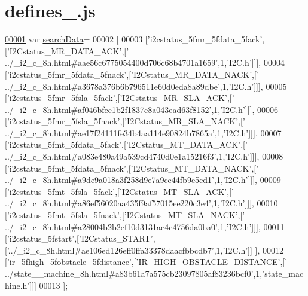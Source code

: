 \hypertarget{defines__7_8js_source}{}\section{defines\+\_.\+js}
\label{defines__7_8js_source}

\begin{DoxyCode}
\hypertarget{defines__7_8js_source.tex_l00001}{}\hyperlink{defines__7_8js_ad01a7523f103d6242ef9b0451861231e}{00001} var \hyperlink{defines__7_8js_ad01a7523f103d6242ef9b0451861231e}{searchData}=
00002 [
00003   [\textcolor{stringliteral}{'i2cstatus\_5fmr\_5fdata\_5fack'},[\textcolor{stringliteral}{'I2Cstatus\_MR\_DATA\_ACK'},[\textcolor{stringliteral}{'
      ../\_i2\_c\_8h.html#aae56c6775054400d706c68b4701a1659'},1,\textcolor{stringliteral}{'I2C.h'}]]],
00004   [\textcolor{stringliteral}{'i2cstatus\_5fmr\_5fdata\_5fnack'},[\textcolor{stringliteral}{'I2Cstatus\_MR\_DATA\_NACK'},[\textcolor{stringliteral}{'
      ../\_i2\_c\_8h.html#a3678a376b6b796511e60d0eda8a89dbe'},1,\textcolor{stringliteral}{'I2C.h'}]]],
00005   [\textcolor{stringliteral}{'i2cstatus\_5fmr\_5fsla\_5fack'},[\textcolor{stringliteral}{'I2Cstatus\_MR\_SLA\_ACK'},[\textcolor{stringliteral}{'
      ../\_i2\_c\_8h.html#af046bfee1b2f1837e8a043ead63f8152'},1,\textcolor{stringliteral}{'I2C.h'}]]],
00006   [\textcolor{stringliteral}{'i2cstatus\_5fmr\_5fsla\_5fnack'},[\textcolor{stringliteral}{'I2Cstatus\_MR\_SLA\_NACK'},[\textcolor{stringliteral}{'
      ../\_i2\_c\_8h.html#ae17f24111fe34b4aa114e90824b7865a'},1,\textcolor{stringliteral}{'I2C.h'}]]],
00007   [\textcolor{stringliteral}{'i2cstatus\_5fmt\_5fdata\_5fack'},[\textcolor{stringliteral}{'I2Cstatus\_MT\_DATA\_ACK'},[\textcolor{stringliteral}{'
      ../\_i2\_c\_8h.html#a083e480a49a539cd4740d0e1a15216f3'},1,\textcolor{stringliteral}{'I2C.h'}]]],
00008   [\textcolor{stringliteral}{'i2cstatus\_5fmt\_5fdata\_5fnack'},[\textcolor{stringliteral}{'I2Cstatus\_MT\_DATA\_NACK'},[\textcolor{stringliteral}{'
      ../\_i2\_c\_8h.html#a9de9a018a3f258d9e7a9ce44fb9e5cd1'},1,\textcolor{stringliteral}{'I2C.h'}]]],
00009   [\textcolor{stringliteral}{'i2cstatus\_5fmt\_5fsla\_5fack'},[\textcolor{stringliteral}{'I2Cstatus\_MT\_SLA\_ACK'},[\textcolor{stringliteral}{'
      ../\_i2\_c\_8h.html#a86ef56020aa435f9af57015ee220c3e4'},1,\textcolor{stringliteral}{'I2C.h'}]]],
00010   [\textcolor{stringliteral}{'i2cstatus\_5fmt\_5fsla\_5fnack'},[\textcolor{stringliteral}{'I2Cstatus\_MT\_SLA\_NACK'},[\textcolor{stringliteral}{'
      ../\_i2\_c\_8h.html#a28004b2b2ef10d3131ac4c4756da0ba0'},1,\textcolor{stringliteral}{'I2C.h'}]]],
00011   [\textcolor{stringliteral}{'i2cstatus\_5fstart'},[\textcolor{stringliteral}{'I2Cstatus\_START'},[\textcolor{stringliteral}{'../\_i2\_c\_8h.html#ae106ed126eff0ffa33378daacfbbcdb7'},1,\textcolor{stringliteral}{'I2C.h'}]]
      ],
00012   [\textcolor{stringliteral}{'ir\_5fhigh\_5fobstacle\_5fdistance'},[\textcolor{stringliteral}{'IR\_HIGH\_OBSTACLE\_DISTANCE'},[\textcolor{stringliteral}{'
      ../state\_\_machine\_8h.html#a83b61a7a575cb23097805af83236bcf0'},1,\textcolor{stringliteral}{'state\_machine.h'}]]]
00013 ];
\end{DoxyCode}

